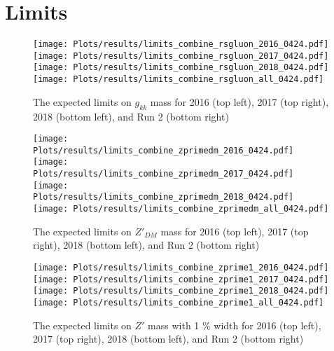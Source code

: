 
\newpage
\section{Limits}
\label{sec:appendix_limits}



\begin{figure}[!htbp]
	\begin{center}
		\texttt{[image: Plots/results/limits\_combine\_rsgluon\_2016\_0424.pdf]} 
		\texttt{[image: Plots/results/limits\_combine\_rsgluon\_2017\_0424.pdf]} \\
		\texttt{[image: Plots/results/limits\_combine\_rsgluon\_2018\_0424.pdf]}
		\texttt{[image: Plots/results/limits\_combine\_rsgluon\_all\_0424.pdf]} 
		
		\caption{ The expected limits on $g_{kk}$ mass for 2016 (top left),  2017 (top right),  2018 (bottom left), and  Run 2 (bottom right)}
		\label{fig:limits_on_RS_gluons}
	\end{center}
\end{figure}

\begin{figure}[!htbp]
	\begin{center}
		\texttt{[image: Plots/results/limits\_combine\_zprimedm\_2016\_0424.pdf]} 
		\texttt{[image: Plots/results/limits\_combine\_zprimedm\_2017\_0424.pdf]} \\
		\texttt{[image: Plots/results/limits\_combine\_zprimedm\_2018\_0424.pdf]}
		\texttt{[image: Plots/results/limits\_combine\_zprimedm\_all\_0424.pdf]} 
		
		\caption{ The expected limits on $Z'_{DM}$ mass for 2016 (top left),  2017 (top right),  2018 (bottom left), and  Run 2 (bottom right)}
		\label{fig:limits_on_zprime1}
	\end{center}
\end{figure}




\begin{figure}[!htbp]
	\begin{center}
		\texttt{[image: Plots/results/limits\_combine\_zprime1\_2016\_0424.pdf]} 
		\texttt{[image: Plots/results/limits\_combine\_zprime1\_2017\_0424.pdf]} \\
		\texttt{[image: Plots/results/limits\_combine\_zprime1\_2018\_0424.pdf]}
		\texttt{[image: Plots/results/limits\_combine\_zprime1\_all\_0424.pdf]} 
		
		\caption{ The expected limits on $Z'$ mass with 1 \% width for 2016 (top left),  2017 (top right),  2018 (bottom left), and  Run 2 (bottom right)}
		\label{fig:limits_on_zprime1}
	\end{center}
\end{figure}

